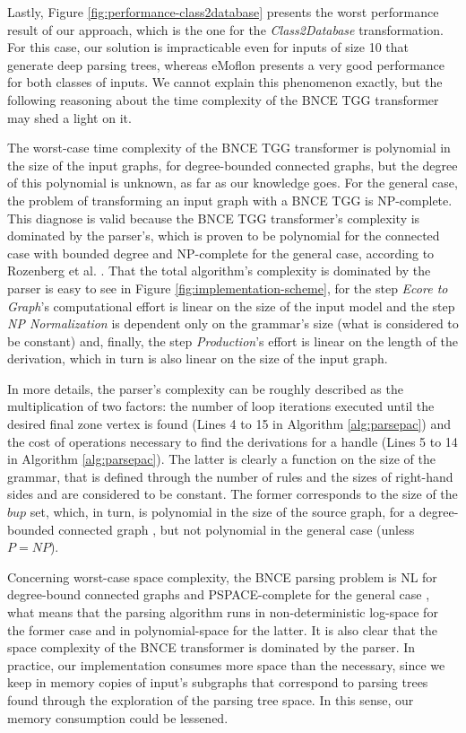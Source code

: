 Lastly, Figure \ref{fig:performance-class2database} presents the worst performance result of our approach, which is the one for the \emph{Class2Database} transformation. For this case, our solution is impracticable even for inputs of size 10 that generate deep parsing trees, whereas eMoflon presents a very good performance for both classes of inputs. We cannot explain this phenomenon exactly, but the following reasoning about the time complexity of the BNCE TGG transformer may shed a light on it.

The worst-case time complexity of the BNCE TGG transformer is polynomial in the size of the input graphs, for degree-bounded connected graphs, but the degree of this polynomial is unknown, as far as our knowledge goes. For the general case, the problem of transforming an input graph with a BNCE TGG is NP-complete. This diagnose is valid because the BNCE TGG transformer's complexity is dominated by the parser's, which is proven to be polynomial for the connected case with bounded degree and NP-complete for the general case, according to Rozenberg et al. \cite[p. 160]{rozenberg1986boundary}. That the total algorithm's complexity is dominated by the parser is easy to see in Figure \ref{fig:implementation-scheme}, for the step \emph{Ecore to Graph}'s computational effort is linear on the size of the input model and the step \emph{NP Normalization} is dependent only on the grammar's size (what is considered to be constant) and, finally, the step \emph{Production}'s effort is linear on the length of the derivation, which in turn is also linear on the size of the input graph.

In more details, the parser's complexity can be roughly described as the multiplication of two factors: the number of loop iterations executed until the desired final zone vertex is found (Lines 4 to 15 in Algorithm \ref{alg:parsepac}) and the cost of operations necessary to find the derivations for a handle (Lines 5 to 14 in Algorithm \ref{alg:parsepac}). The latter is clearly a function on the size of the grammar, that is defined through the number of rules and the sizes of right-hand sides and are considered to be constant. The former corresponds to the size of the $bup$ set, which, in turn, is polynomial in the size of the source graph, for a degree-bounded connected graph \cite[p. 161]{rozenberg1986boundary}, but not polynomial in the general case (unless $P=NP$).

Concerning worst-case space complexity, the BNCE parsing problem is NL for degree-bound connected graphs \cite{kim2001efficient} and PSPACE-complete for the general case \cite{rozenberg1986boundary}, what means that the parsing algorithm runs in non-deterministic log-space for the former case and in polynomial-space for the latter. It is also clear that the space complexity of the BNCE transformer is dominated by the parser. In practice, our implementation consumes more space than the necessary, since we keep in memory copies of input's subgraphs that correspond to parsing trees found through the exploration of the parsing tree space. In this sense, our memory consumption could be lessened.

